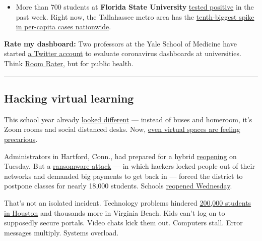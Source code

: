 \begin{itemize}
\tightlist
\item
  More than 700 students at \textbf{Florida State University}
  \href{https://www.tallahassee.com/story/news/2020/09/08/fsu-reports-sharp-spike-number-students-testing-positive-covid-19/5745837002/}{tested
  positive} in the past week. Right now, the Tallahassee metro area has
  the
  \href{https://www.nytimes3xbfgragh.onion/interactive/2020/04/23/upshot/five-ways-to-monitor-coronavirus-outbreak-us.html}{tenth-biggest
  spike in per-capita cases nationwide}.
\end{itemize}

\textbf{Rate my dashboard:} Two professors at the Yale School of
Medicine have started \href{https://twitter.com/CovidDashboards}{a
Twitter account} to evaluate coronavirus dashboards at universities.
Think \href{https://twitter.com/ratemyskyperoom}{Room Rater}, but for
public health.

\begin{center}\rule{0.5\linewidth}{\linethickness}\end{center}

\hypertarget{hacking-virtual-learning}{%
\subsection{Hacking virtual learning}\label{hacking-virtual-learning}}

This school year already
\href{https://www.nytimes3xbfgragh.onion/2020/09/05/us/virtual-return-to-school-covid.html}{looked
different} --- instead of buses and homeroom, it's Zoom rooms and social
distanced desks. Now,
\href{https://www.nytimes3xbfgragh.onion/2020/09/08/us/school-districts-cyberattacks-glitches.html}{even
virtual spaces are feeling precarious}.

Administrators in Hartford, Conn., had prepared for a hybrid
\href{https://www.nytimes3xbfgragh.onion/2020/09/09/us/schools-reopening-coronavirus.html}{reopening}
on Tuesday. But a
\href{https://www.nytimes3xbfgragh.onion/2020/02/09/technology/ransomware-attacks.html}{ransomware
attack} --- in which hackers locked people out of their networks and
demanded big payments to get back in --- forced the district to postpone
classes for nearly 18,000 students. Schools
\href{https://www.courant.com/community/hartford/hc-news-hartford-ransomware-schools-20200908-zaq4q6n3pza47i4p6lv5lfefm4-story.html}{reopened
Wednesday}.

That's not an isolated incident. Technology problems hindered
\href{https://www.houstonpublicmedia.org/articles/news/education-news/2020/09/08/381355/back-to-school-begins-with-website-crash-for-houston-students-and-teachers/}{200,000
students in Houston} and thousands more in Virginia Beach. Kids can't
log on to supposedly secure portals. Video chats kick them out.
Computers stall. Error messages multiply. Systems overload.

